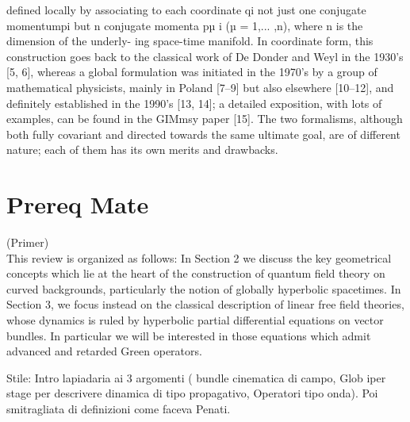 \documentclass[Main]{subfiles}
\begin{document}
\begin{Warning}
defined locally by associating to each coordinate qi not just one conjugate momentumpi but n conjugate momenta pµ
i (µ = 1,... ,n), where n is the dimension of the underly-
ing space-time manifold. In coordinate form, this construction goes back to the classical work of De Donder and Weyl in the 1930’s [5, 6], whereas a global formulation was initiated in the 1970’s by a group of mathematical physicists, mainly in Poland [7–9] but also elsewhere [10–12], and definitely established in the 1990’s [13, 14]; a detailed exposition, with lots of examples, can be found in the GIMmsy paper [15]. The two formalisms, although both fully covariant and directed towards the same ultimate goal, are of different nature; each of them has its own merits and drawbacks.




\end{Warning}







\chapter{Prereq Mate}


	\begin{Warning}
	(Primer)\\
	This review is organized as follows: In Section 2 we discuss the key geometrical concepts which lie
at the heart of the construction of quantum field theory on curved backgrounds, particularly the notion of globally hyperbolic spacetimes. In Section 3, we focus instead on the classical description of linear free field theories, whose dynamics is ruled by hyperbolic partial differential equations on vector bundles. In particular we will be interested in those equations which admit advanced and retarded Green operators.
	\end{Warning}	
	\begin{Warning}
		Stile: Intro lapiadaria ai 3 argomenti ( bundle cinematica di campo, Glob iper stage per descrivere dinamica di tipo propagativo, Operatori tipo onda). Poi smitragliata di definizioni come faceva Penati.
	\end{Warning}	
	
\end{document}
